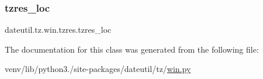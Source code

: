 \subsubsection{\texorpdfstring{tzres\+\_\+loc}{tzres\_loc}}
{\footnotesize\ttfamily dateutil.\+tz.\+win.\+tzres.\+tzres\+\_\+loc}



The documentation for this class was generated from the following file\+:\begin{DoxyCompactItemize}
\item 
venv/lib/python3./site-\/packages/dateutil/tz/\hyperlink{win_8py}{win.\+py}\end{DoxyCompactItemize}
